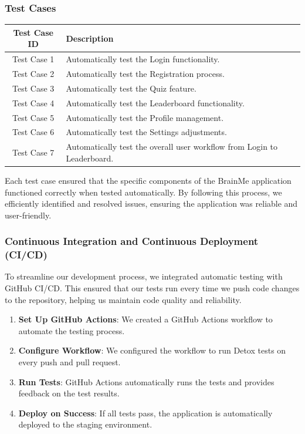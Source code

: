 \subsubsection{Test Cases}

\begin{tabular}{|c|l|}
    \hline
    \textbf{Test Case ID} & \textbf{Description} \\
    \hline
    Test Case 1 & Automatically test the Login functionality. \\
    \hline
    Test Case 2 & Automatically test the Registration process. \\
    \hline
    Test Case 3 & Automatically test the Quiz feature. \\
    \hline
    Test Case 4 & Automatically test the Leaderboard functionality. \\
    \hline
    Test Case 5 & Automatically test the Profile management. \\
    \hline
    Test Case 6 & Automatically test the Settings adjustments. \\
    \hline
    Test Case 7 & Automatically test the overall user workflow from Login to Leaderboard. \\
    \hline
\end{tabular}

\vspace{1cm}

Each test case ensured that the specific components of the BrainMe application functioned correctly when tested automatically. By following this process, we efficiently identified and resolved issues, ensuring the application was reliable and user-friendly.

\subsubsection{Continuous Integration and Continuous Deployment (CI/CD)}

To streamline our development process, we integrated automatic testing with GitHub CI/CD. This ensured that our tests run every time we push code changes to the repository, helping us maintain code quality and reliability.

\begin{enumerate}
    \item \textbf{Set Up GitHub Actions}: We created a GitHub Actions workflow to automate the testing process.
    \item \textbf{Configure Workflow}: We configured the workflow to run Detox tests on every push and pull request.
    \item \textbf{Run Tests}: GitHub Actions automatically runs the tests and provides feedback on the test results.
    \item \textbf{Deploy on Success}: If all tests pass, the application is automatically deployed to the staging environment.
\end{enumerate}

